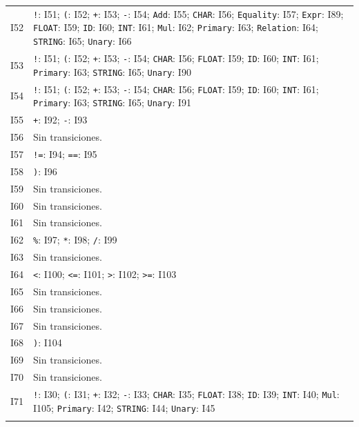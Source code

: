 {\begin{longtable}{@{}r p{14.7cm}@{}}
I52 & \texttt{!}: I51; \texttt{(}: I52; \texttt{+}: I53; \texttt{-}: I54; \texttt{Add}: I55; \texttt{CHAR}: I56; \texttt{Equality}: I57; \texttt{Expr}: I89; \texttt{FLOAT}: I59; \texttt{ID}: I60; \texttt{INT}: I61; \texttt{Mul}: I62; \texttt{Primary}: I63; \texttt{Relation}: I64; \texttt{STRING}: I65; \texttt{Unary}: I66\\\addlinespace[3pt]
I53 & \texttt{!}: I51; \texttt{(}: I52; \texttt{+}: I53; \texttt{-}: I54; \texttt{CHAR}: I56; \texttt{FLOAT}: I59; \texttt{ID}: I60; \texttt{INT}: I61; \texttt{Primary}: I63; \texttt{STRING}: I65; \texttt{Unary}: I90\\\addlinespace[3pt]
I54 & \texttt{!}: I51; \texttt{(}: I52; \texttt{+}: I53; \texttt{-}: I54; \texttt{CHAR}: I56; \texttt{FLOAT}: I59; \texttt{ID}: I60; \texttt{INT}: I61; \texttt{Primary}: I63; \texttt{STRING}: I65; \texttt{Unary}: I91\\\addlinespace[3pt]
I55 & \texttt{+}: I92; \texttt{-}: I93\\\addlinespace[3pt]
I56 & Sin transiciones.\\\addlinespace[3pt]
I57 & \texttt{!=}: I94; \texttt{==}: I95\\\addlinespace[3pt]
I58 & \texttt{)}: I96\\\addlinespace[3pt]
I59 & Sin transiciones.\\\addlinespace[3pt]
I60 & Sin transiciones.\\\addlinespace[3pt]
I61 & Sin transiciones.\\\addlinespace[3pt]
I62 & \texttt{\%}: I97; \texttt{*}: I98; \texttt{/}: I99\\\addlinespace[3pt]
I63 & Sin transiciones.\\\addlinespace[3pt]
I64 & \texttt{\textless{}}: I100; \texttt{\textless{}=}: I101; \texttt{\textgreater{}}: I102; \texttt{\textgreater{}=}: I103\\\addlinespace[3pt]
I65 & Sin transiciones.\\\addlinespace[3pt]
I66 & Sin transiciones.\\\addlinespace[3pt]
I67 & Sin transiciones.\\\addlinespace[3pt]
I68 & \texttt{)}: I104\\\addlinespace[3pt]
I69 & Sin transiciones.\\\addlinespace[3pt]
I70 & Sin transiciones.\\\addlinespace[3pt]
I71 & \texttt{!}: I30; \texttt{(}: I31; \texttt{+}: I32; \texttt{-}: I33; \texttt{CHAR}: I35; \texttt{FLOAT}: I38; \texttt{ID}: I39; \texttt{INT}: I40; \texttt{Mul}: I105; \texttt{Primary}: I42; \texttt{STRING}: I44; \texttt{Unary}: I45\\\addlinespace[3pt]

\end{longtable}}
